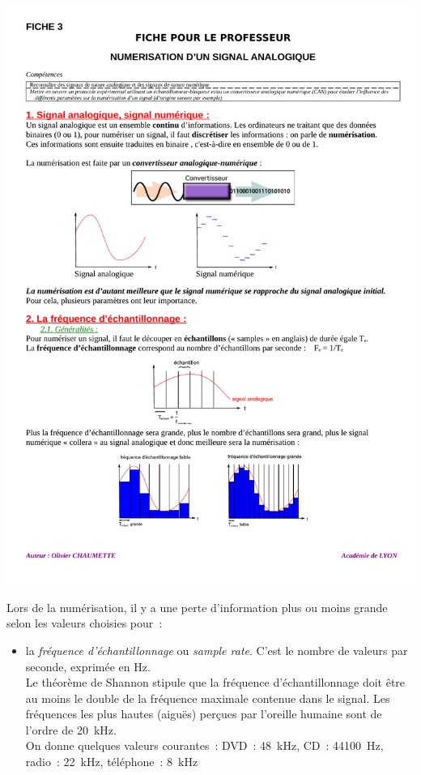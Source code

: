 \documentclass[10pt,fleqn]{article} %
\begin{document}
\begin{multicols}{2}
\centerline{\includegraphics[width=\linewidth]{images/theme_son_2_fig_2}}

Lors de la numérisation, il y a une perte d'information plus ou moins
grande selon les valeurs choisies pour~: 
\begin{itemize}
\item 
  la \emph{fréquence d'échantillonnage} ou \emph{sample rate}. C'est le
  nombre de valeurs par seconde, exprimée en Hz. \\
  Le théorème de Shannon stipule que la fréquence d'échantillonnage doit
  être au moins le double de la fréquence maximale contenue dans le
  signal. Les fréquences les plus hautes (aiguës) perçues par l'oreille
  humaine sont de l'ordre de 20~kHz. \\
  On donne quelques valeurs courantes~: DVD~: 48~kHz, CD~: 44100~Hz,
  radio~: 22~kHz, téléphone~: 8~kHz  
  

\end{itemize}
\end{multicols}
\end{document}
